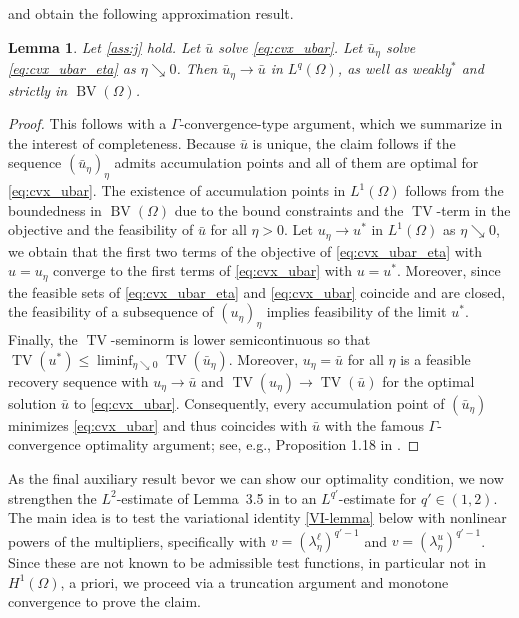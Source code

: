 \documentclass[11pt]{article}
\DeclareMathOperator*{\BV}{BV}
\DeclareMathOperator*{\TV}{TV}
\newtheorem{lemma}[theorem]{Lemma}
\theoremstyle{definition}
\theoremstyle{remark}
\begin{document}
%
and obtain the following approximation result.
%
\begin{lemma}\label{lem:ubar_eta_strictly}
Let \cref{ass:j} hold.
Let $\bar{u}$ solve \eqref{eq:cvx_ubar}. Let $\bar{u}_\eta$ solve \eqref{eq:cvx_ubar_eta} as $\eta \searrow 0$.
Then $\bar{u}_\eta \to \bar{u}$ in $L^{q}(\Omega)$, as well as weakly$^*$ and strictly in $\BV(\Omega)$.
\end{lemma}
\begin{proof}
This follows with a $\Gamma$-convergence-type argument, which we summarize in the interest of completeness.
Because $\bar{u}$ is unique, the claim follows if the sequence $(\bar{u}_\eta)_\eta$ admits accumulation points and all
of them are optimal for \eqref{eq:cvx_ubar}. The existence of accumulation points in $L^1(\Omega)$ follows from the
boundedness in $\BV(\Omega)$ due to the bound constraints and the $\TV$-term in the objective and the feasibility of $\bar{u}$
for all $\eta > 0$. Let $u_\eta \to u^*$ in $L^1(\Omega)$ as $\eta \searrow 0$, we obtain that the first two terms
of the objective of \eqref{eq:cvx_ubar_eta} with $u = u_\eta$ converge to the first terms of \eqref{eq:cvx_ubar} with $u = u^*$.
Moreover, since the feasible sets of \eqref{eq:cvx_ubar_eta} and \eqref{eq:cvx_ubar} coincide and are closed,
the feasibility of a subsequence of $(u_\eta)_\eta$ implies feasibility of the limit $u^*$. Finally,
the $\TV$-seminorm is lower semicontinuous so that $\TV(u^*) \le \liminf_{\eta\searrow 0} \TV(\bar{u}_\eta)$.
Moreover, $u_\eta = \bar{u}$ for all $\eta$ is a feasible recovery sequence with $u_\eta \to \bar{u}$ and
$\TV(u_\eta) \to \TV(\bar{u})$ for the optimal solution $\bar{u}$ to \eqref{eq:cvx_ubar}. Consequently, every accumulation point
of $(\bar{u}_\eta)$ minimizes \eqref{eq:cvx_ubar} and thus coincides with $\bar{u}$ with the famous $\Gamma$-convergence
optimality argument; see, e.g., Proposition 1.18 in \cite{braides2002gamma}.
\end{proof}
%
As the final auxiliary result bevor we can show our optimality condition,
we now strengthen the $L^2$-estimate of Lemma~3.5 in \cite{natemeyer2022penalty}
to an $L^{q'}$-estimate for $q' \in(1,2)$. The main idea is to test the
variational identity \eqref{VI-lemma} below with nonlinear powers of the multipliers, 
specifically with $v = (\lambda^\ell_\eta)^{q' - 1}$ and $v = (\lambda^u_\eta)^{q' - 1}$. 
Since these are not known to be admissible test functions, in particular not in
$H^1(\Omega)$, a priori, we proceed via a truncation argument and monotone convergence
to prove the claim.
%
\end{document}
